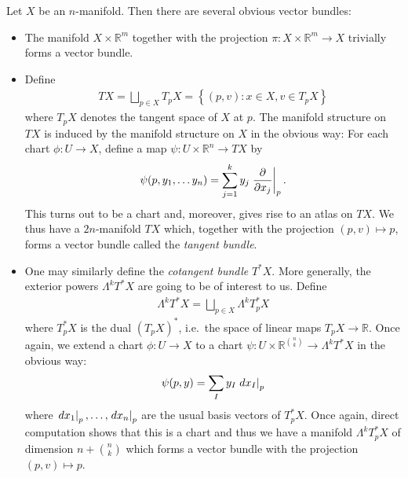 \documentclass{article}
\begin{document}
\begin{example}\label{ex:bundles}
  Let $X$ be an $n$-manifold. Then there are several obvious vector bundles:
  \begin{itemize}
    \item The manifold $X\times\mathbb{R}^m$ together with the projection $\pi : X\times\mathbb{R}^m\to X$ trivially forms a vector bundle.
    \item Define
      \begin{align*}
        TX = \bigsqcup_{p\in X} T_p X = \left\lbrace{(p, v) : x \in X, v \in T_p X}\right\rbrace
      \end{align*}
      where $T_p X$ denotes the tangent space of $X$ at $p$. The manifold
      structure on $TX$ is induced by the manifold structure on $X$ in the
      obvious way: For each chart $\phi:U\to X$, define a map
      $\psi:U\times\mathbb{R}^n\to TX$ by
      \begin{align*}
        \psi(p,y_1,\ldots y_n)
        = \sum_{j=1}^k y_j \left.{\frac{\partial}{\partial x_j}}\right\vert_{p}.
      \end{align*}
      This turns out to be a chart  and, moreover, gives rise
      to an atlas on $TX$. We thus have a $2n$-manifold $TX$ which, together with the projection $(p,v)\mapsto p$, forms a vector bundle called the \emph{tangent bundle}.
    \item One may similarly define the \emph{cotangent bundle} $T^*X$.
      More generally, the exterior powers $\Lambda^k T^* X$ are going
      to be of interest to us. Define
      \begin{align*}
        \Lambda^k T^*X = \bigsqcup_{p\in X} \Lambda^k T^*_p X
      \end{align*}
      where $T^*_p X$ is the dual $(T_pX)^*$, i.e.~the space of linear
      maps $T_p X\to\mathbb{R}$. Once again, we extend a chart
      $\phi:U\to X$ to a chart $\psi : U\times\mathbb{R}^{\binom{n}{k}}\to \Lambda^k T^*X$ in the obvious way:
      \begin{align*}
        \psi(p,y) = \sum_I y_I \left.{dx_I}\right\vert_{p}
      \end{align*}
      where $\left.{dx_1}\right\vert_{p},\ldots,\left.{dx_n}\right\vert_{p}$ are the usual basis vectors of
      $T^*_p X$. Once again, direct computation shows that this is a chart and
      thus we have a manifold $\Lambda^k T^*_p X$ of dimension
      $n+\binom{n}{k}$ which forms a vector bundle with the
      projection $(p,v)\mapsto p$.
  \end{itemize}
\end{example}
\end{document}
